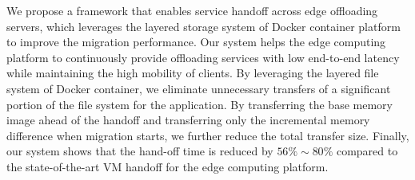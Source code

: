 We propose a framework that enables service handoff across edge offloading servers, which leverages the layered storage system of Docker container platform to improve the migration performance.
Our system helps the edge computing platform to continuously provide offloading services with low end-to-end latency while maintaining the high mobility of clients. 
By leveraging the layered file system of Docker container, we eliminate unnecessary transfers of a significant portion of the file system for the application. 
By transferring the base memory image ahead of the handoff and transferring only the incremental memory difference when migration starts, we further reduce the total transfer size. Finally, our system shows that the hand-off time is reduced by $56\%\sim 80\%$ compared to the state-of-the-art VM handoff for the edge computing platform.



